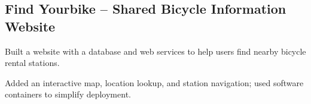 \subsection{{Find Yourbike -- Shared Bicycle Information Website}}
\begin{zitemize}
    \item Built a website with a database and web services to help users find nearby bicycle rental stations.
    \item Added an interactive map, location lookup, and station navigation; used software containers to simplify deployment.
\end{zitemize}
